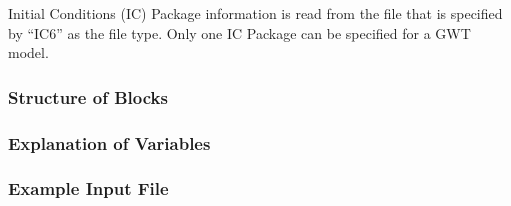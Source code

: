 Initial Conditions (IC) Package information is read from the file that is specified by ``IC6'' as the file type.  Only one IC Package can be specified for a GWT model. 

\vspace{5mm}
\subsubsection{Structure of Blocks}
%


\vspace{5mm}
\subsubsection{Explanation of Variables}
\begin{description}

\end{description}

\vspace{5mm}
\subsubsection{Example Input File}


